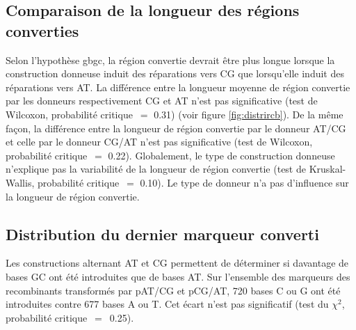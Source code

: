 \subsection{Comparaison de la longueur des régions converties}
\label{subsec:longueur}

Selon l'hypothèse \ac{gbgc}, la région convertie devrait être plus longue
lorsque la construction donneuse induit des réparations vers CG que lorsqu'elle
induit des réparations vers AT. La différence entre la longueur moyenne de
région convertie par les donneurs respectivement CG et AT n'est pas
significative (test de Wilcoxon, probabilité critique~\(=\) \num{0.31}) (voir
figure \ref{fig:distrircb}). De la même façon, la différence entre la longueur
de région convertie par le donneur AT/CG et celle par le donneur CG/AT n'est pas
significative (test de Wilcoxon, probabilité critique~\(=\) \num{0.22}).
Globalement, le type de construction donneuse n'explique pas la variabilité de
la longueur de région convertie (test de Kruskal-Wallis, probabilité
critique~\(=\) \num{0.10}). Le type de donneur n'a pas d'influence sur la
longueur de région convertie.

\subsection{Distribution du dernier marqueur converti}
\label{subsec:distribution-points}


Les constructions alternant AT et CG permettent de déterminer si davantage de
bases GC ont été introduites que de bases AT. Sur l'ensemble des marqueurs des
recombinants transformés par pAT/CG et pCG/AT, \num{720} bases C ou G ont été
introduites contre \num{677} bases A ou T. Cet écart n'est pas significatif
(test du $\chi^2$, probabilité critique~$=$~\num{0.25}).

